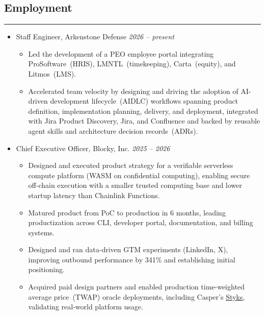 \subsection*{Employment}
\hrule
\vspace{0.2cm}

\begin{itemize}
    \item Staff Engineer, Arkenstone Defense
    \hfill {\it 2026 -- present}

    \begin{itemize}
        \item Led the development of a PEO employee portal integrating
        ProSoftware~(HRIS), LMNTL~(timekeeping), Carta~(equity), and
        Litmos~(LMS).

        \item Accelerated team velocity by designing and driving the adoption of
        AI-driven development lifecycle~(AIDLC) workflows spanning product
        definition, implementation planning, delivery, and deployment,
        integrated with Jira Product Discovery, Jira, and Confluence and backed
        by reusable agent skills and architecture decision records~(ADRs).
    \end{itemize}

    \item Chief Executive Officer, Blocky, Inc.
    \hfill {\it 2025 -- 2026}

    \begin{itemize}
        \item Designed and executed product strategy for a verifiable serverless
        compute platform (WASM on confidential computing),
        enabling secure off-chain execution with a smaller trusted computing
        base and lower startup latency than Chainlink Functions.

        \item Matured product from PoC to production in 6 months, leading
        productization across CLI, developer portal, documentation, and billing
        systems.

        \item Designed and ran data-driven GTM experiments (LinkedIn, X),
        improving outbound performance by 341\% and establishing initial
        positioning.

        \item Acquired paid design partners and enabled production time-weighted
        average price~(TWAP) oracle deployments, including Casper's
        \href{https://web.archive.org/web/20251112225628/https://styks.odra.dev/}{Styks},
        validating real-world platform usage.


\end{itemize}
\end{itemize}
